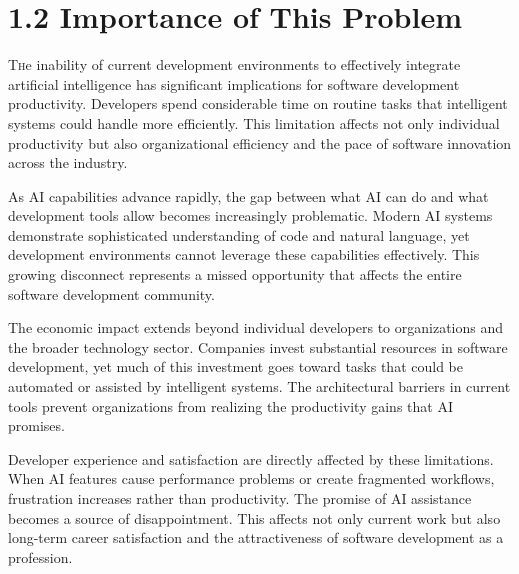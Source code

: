 \clearpage
\section{1.2 Importance of This Problem}
\label{sec:importance}

\lettrine{T}he inability of current development environments to effectively integrate artificial intelligence has significant implications for software development productivity. Developers spend considerable time on routine tasks that intelligent systems could handle more efficiently. This limitation affects not only individual productivity but also organizational efficiency and the pace of software innovation across the industry.

As AI capabilities advance rapidly, the gap between what AI can do and what development tools allow becomes increasingly problematic. Modern AI systems demonstrate sophisticated understanding of code and natural language, yet development environments cannot leverage these capabilities effectively. This growing disconnect represents a missed opportunity that affects the entire software development community.

The economic impact extends beyond individual developers to organizations and the broader technology sector. Companies invest substantial resources in software development, yet much of this investment goes toward tasks that could be automated or assisted by intelligent systems. The architectural barriers in current tools prevent organizations from realizing the productivity gains that AI promises.

Developer experience and satisfaction are directly affected by these limitations. When AI features cause performance problems or create fragmented workflows, frustration increases rather than productivity. The promise of AI assistance becomes a source of disappointment. This affects not only current work but also long-term career satisfaction and the attractiveness of software development as a profession.

